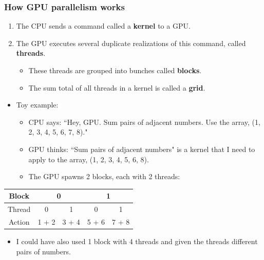 \documentclass[handout]{beamer}
\numberwithin{equation}{section}
\begin{document}
\begin{frame}
\frametitle{How GPU parallelism works}
\begin{enumerate}
\item The CPU sends a command called a {\bf kernel} to a GPU.
\pause \item The GPU executes several duplicate realizations of this command, called {\bf threads}.
\begin{itemize}
\pause \item These threads are grouped into bunches called {\bf blocks}.
\pause \item The sum total of all threads in a kernel is called a {\bf grid}.
\end{itemize}
\end{enumerate}

\begin{itemize}
\item Toy example:
\begin{itemize}
\item CPU says: ``Hey, GPU. Sum pairs of adjacent numbers. Use the array, (1, 2, 3, 4, 5, 6, 7, 8)."
\pause \item GPU thinks: ``Sum pairs of adjacent numbers" is a kernel that I need to apply to the array, (1, 2, 3, 4, 5, 6, 8).
\pause \item The GPU spawns 2 blocks, each with 2 threads:
\end{itemize}
\end{itemize}

\pause \begin{center}
\begin{tabular}{c|cc|cc}
Block  & \multicolumn{2}{c|}{0} &  \multicolumn{2}{c}{1} \\ \hline
Thread & 0 & 1 & 0 & 1  \\ \hline
Action & 1 + 2 & 3 + 4 & 5 + 6 & 7 + 8 \\
\end{tabular}
\end{center}

\begin{itemize}
\pause \item I could have also used 1 block with 4 threads and given the threads different pairs of numbers.
\end{itemize}
\end{frame}
\end{document}

